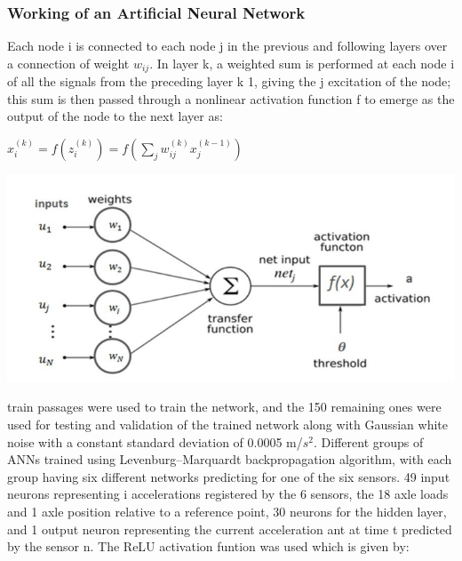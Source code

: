 \documentclass{article}
\begin{document}
\subsubsection{Working of an Artificial Neural Network}
Each node i is connected to each node j in the previous and following layers over a connection of weight $w_{ij}$. In layer k, a weighted sum is performed at each node i of all the signals from the preceding layer k 1, giving the j excitation of the node; this sum is then passed through a nonlinear activation function f to emerge as the output of the node to the next layer as:

\begin{center}
    $x_i^{(k)} = f(z_i^{(k)}) = f(\sum_{j}^{}w_{ij}^{(k)}x_j^{(k-1)})$
    
    \includegraphics[scale=0.35]{Images/Artificial-Neuron-Structure.png}
    
\end{center}

 train passages were used to train the network, and the 150 remaining ones were used for testing and validation of the trained network along with Gaussian white noise with a constant standard deviation of 0.0005 m/$s^2$. Different groups of ANNs trained using Levenburg–Marquardt backpropagation algorithm, with each group having six different networks predicting for one of the six sensors. 49 input neurons representing i accelerations registered by the 6 sensors, the 18 axle loads and 1 axle position relative to a reference point, 30 neurons for the hidden layer, and 1 output neuron representing the current acceleration ant at time t predicted by the sensor n. The ReLU activation funtion was used which is given by:
\end{document}
